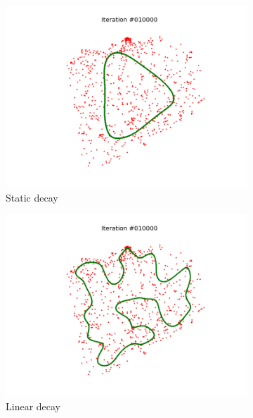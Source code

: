 \documentclass[11pt]{article}
\begin{document}
\begin{figure}
\centering
\begin{subfigure}{.33\textwidth}
  \centering
  \includegraphics[trim={4cm 2cm 4cm 2cm}, clip=true,
  width=\linewidth]{u_s.png}
  \caption{Static decay}
\end{subfigure}%
\begin{subfigure}{.33\textwidth}
  \centering
  \includegraphics[trim={4cm 2cm 4cm 2cm}, clip=true,width=\linewidth]{u_l.png}
  \caption{Linear decay}
\end{subfigure}
\begin{subfigure}{.33\textwidth}
  \centering

\end{subfigure}
\end{figure}
\end{document}
